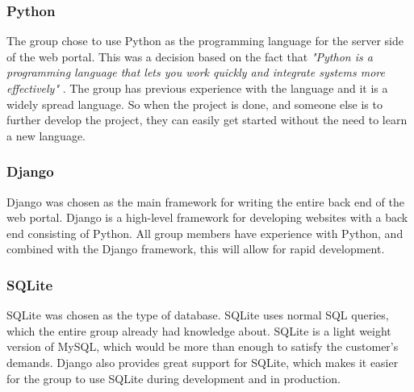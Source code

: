 \subsubsection{Python}
\label{python}
The group chose to use Python as the programming language for the server side of the web portal. This was a decision based on the fact that \textit{"Python is a programming language that lets you work quickly and integrate systems more effectively"} \cite{python}. The group has previous experience with the language and it is a widely spread language. So when the project is done, and someone else is to further develop the project, they can easily get started without the need to learn a new language.

\subsubsection{Django}
\label{django}
Django \cite{django} was chosen as the main framework for writing the entire back end of the web portal. Django is a high-level framework for developing websites with a back end consisting of Python. All group members have experience with Python, and combined with the Django framework, this will allow for rapid development.  

\subsubsection{SQLite}
SQLite\cite{SQLite} was chosen as the type of database. SQLite uses normal SQL queries, which the entire group already had knowledge about. SQLite is a light weight version of MySQL, which would be more than enough to satisfy the customer's demands. Django also provides great support for SQLite, which makes it easier for the group to use SQLite during development and in production.


\cleardoublepage